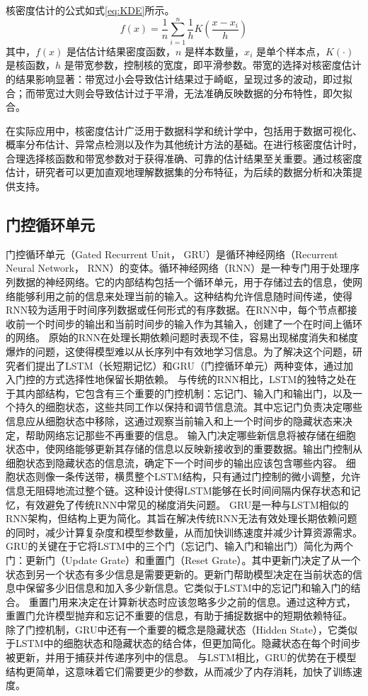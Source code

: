 核密度估计的公式如式\eqref{eq:KDE}所示。
\begin{equation}
    f(x) = \frac{1}{n}\sum_{i=1}^{n} \frac{1}{h}K\left(\frac{x-x_i}{h}\right)
    \label{eq:KDE}
\end{equation}
其中，\(f(x)\) 是估估计结果密度函数，\(n\) 是样本数量，\(x_i\) 是单个样本点，\(K(\cdot)\) 是核函数，\(h\) 是带宽参数，控制核的宽度，即平滑参数。带宽的选择对核密度估计的结果影响显著：带宽过小会导致估计结果过于崎岖，呈现过多的波动，即过拟合；而带宽过大则会导致估计过于平滑，无法准确反映数据的分布特性，即欠拟合。

在实际应用中，核密度估计广泛用于数据科学和统计学中，包括用于数据可视化、概率分布估计、异常点检测以及作为其他统计方法的基础。在进行核密度估计时，合理选择核函数和带宽参数对于获得准确、可靠的估计结果至关重要。通过核密度估计，研究者可以更加直观地理解数据集的分布特征，为后续的数据分析和决策提供支持。

\subsection{门控循环单元}
门控循环单元（Gated Recurrent Unit， GRU）是循环神经网络（Recurrent Neural
Network， RNN）的变体。循环神经网络（RNN）是一种专门用于处理序列数据的神经网络。它的内部结构包括一个循环单元，用于存储过去的信息，使网络能够利用之前的信息来处理当前的输入。这种结构允许信息随时间传递，使得RNN较为适用于时间序列数据或任何形式的有序数据。在RNN中，每个节点都接收前一个时间步的输出和当前时间步的输入作为其输入，创建了一个在时间上循环的网络。
原始的RNN在处理长期依赖问题时表现不佳，容易出现梯度消失和梯度爆炸的问题，这使得模型难以从长序列中有效地学习信息。为了解决这个问题，研究者们提出了LSTM（长短期记忆）和GRU（门控循环单元）两种变体，通过加入门控的方式选择性地保留长期依赖。
与传统的RNN相比，LSTM的独特之处在于其内部结构，它包含有三个重要的门控机制：忘记门、输入门和输出门，以及一个持久的细胞状态，这些共同工作以保持和调节信息流。其中忘记门负责决定哪些信息应从细胞状态中移除，这通过观察当前输入和上一个时间步的隐藏状态来决定，帮助网络忘记那些不再重要的信息。
输入门决定哪些新信息将被存储在细胞状态中，使网络能够更新其存储的信息以反映新接收到的重要数据。输出门控制从细胞状态到隐藏状态的信息流，确定下一个时间步的输出应该包含哪些内容。
细胞状态则像一条传送带，横贯整个LSTM结构，只有通过门控制的微小调整，允许信息无阻碍地流过整个链。这种设计使得LSTM能够在长时间间隔内保存状态和记忆，有效避免了传统RNN中常见的梯度消失问题。
GRU是一种与LSTM相似的RNN架构，但结构上更为简化。其旨在解决传统RNN无法有效处理长期依赖问题的同时，减少计算复杂度和模型参数量，从而加快训练速度并减少计算资源需求。
GRU的关键在于它将LSTM中的三个门（忘记门、输入门和输出门）简化为两个门：更新门（Update Grate）和重置门（Reset Grate）。其中更新门决定了从一个状态到另一个状态有多少信息是需要更新的。更新门帮助模型决定在当前状态的信息中保留多少旧信息和加入多少新信息。它类似于LSTM中的忘记门和输入门的结合。
重置门用来决定在计算新状态时应该忽略多少之前的信息。通过这种方式，重置门允许模型抛弃和忘记不重要的信息，有助于捕捉数据中的短期依赖特征。
除了门控机制，GRU中还有一个重要的概念是隐藏状态（Hidden State），它类似于LSTM中的细胞状态和隐藏状态的结合体，但更加简化。隐藏状态在每个时间步被更新，并用于捕获并传递序列中的信息。
与LSTM相比，GRU的优势在于模型结构更简单，这意味着它们需要更少的参数，从而减少了内存消耗，加快了训练速度。
